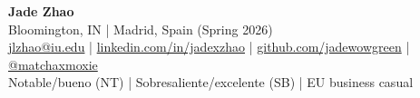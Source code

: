 
\begin{center}
    {\LARGE \textbf{Jade Zhao}}\\
    \vspace{0.25em}
    {\small Bloomington, IN \;|\; Madrid, Spain (Spring 2026)}\\
    \vspace{0.25em}
    {\small
      \href{mailto:jlzhao@iu.edu}{jlzhao@iu.edu}
      \;|\;
      \href{https://linkedin.com/in/jadexzhao}{linkedin.com/in/jadexzhao}
      \;|\;
      \href{https://github.com/jadewowgreen}{github.com/jadewowgreen}
      \;|\;
      \href{https://www.instagram.com/matchaxmoxie/}{@matchaxmoxie}
    }
    \\
    {\small Notable/bueno (NT) \;|\; Sobresaliente/excelente (SB) \;|\; EU business casual}
\end{center}
